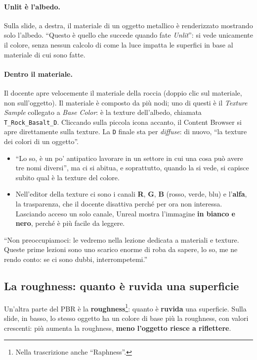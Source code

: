 \paragraph{Unlit è l'albedo.} Sulla slide, a destra, il materiale di un oggetto
metallico è renderizzato mostrando solo l'albedo. ``Questo è quello che succede
quando fate \emph{Unlit}'': si vede unicamente il colore, senza nessun calcolo di
come la luce impatta le superfici in base al materiale di cui sono fatte.

\paragraph{Dentro il materiale.} Il docente apre velocemente il materiale della
roccia (doppio clic sul materiale, non sull'oggetto). Il materiale è composto da
più nodi; uno di questi è il \emph{Texture Sample} collegato a \emph{Base Color}:
è la texture dell'albedo, chiamata \texttt{T\_Rock\_Basalt\_D}. Cliccando sulla
piccola icona accanto, il Content Browser si apre direttamente sulla texture. La
\texttt{D} finale sta per \emph{diffuse}: di nuovo, ``la texture dei colori di un
oggetto''.
\begin{itemize}
  \item ``Lo so, è un po' antipatico lavorare in un settore in cui una cosa può
        avere tre nomi diversi'', ma ci si abitua, e soprattutto, quando la si
        vede, si capisce subito qual è la texture del colore.
  \item Nell'editor della texture ci sono i canali \textbf{R}, \textbf{G},
        \textbf{B} (rosso, verde, blu) e l'\textbf{alfa}, la trasparenza, che il
        docente disattiva perché per ora non interessa. Lasciando acceso un solo
        canale, Unreal mostra l'immagine \textbf{in bianco e nero}, perché è più
        facile da leggere.
\end{itemize}
``Non preoccupiamoci: le vedremo nella lezione dedicata a materiali e texture.
Queste prime lezioni sono uno scarico enorme di roba da sapere, lo so, me ne rendo
conto: se ci sono dubbi, interrompetemi.''

\subsection{La roughness: quanto è ruvida una superficie}

Un'altra parte del PBR è la \textbf{roughness}\footnote{Nella trascrizione anche
``Raphness''.}: quanto è \textbf{ruvida} una superficie. Sulla slide, in basso, lo
stesso oggetto ha un colore di base più la roughness, con valori crescenti: più
aumenta la roughness, \textbf{meno l'oggetto riesce a riflettere}.


